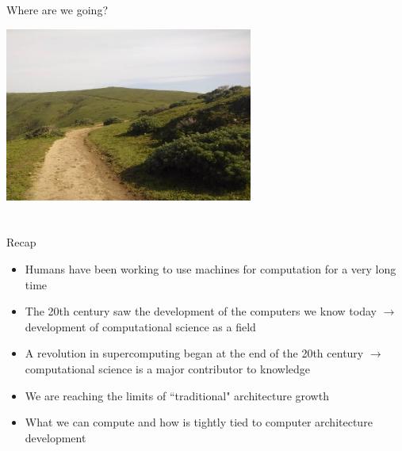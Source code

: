 \documentclass[xcolor=x11names,compress]{beamer}
\renewcommand{\(}{\begin{columns}}
\renewcommand{\)}{\end{columns}}
\newcommand{\<}[1]{\begin{column}{#1}}
\renewcommand{\>}{\end{column}}
\begin{document}
\begin{frame}{Where are we going?}
\begin{center}
\includegraphics[height=2.25in]{road}
\end{center}
\end{frame}

\section*{}
\begin{frame}{Recap}
\begin{itemize}
\item Humans have been working to use machines for computation for a very long time\vspace*{0.5 em}
\item The 20th century saw the development of the computers we know today $\rightarrow$ development of computational science as a field\vspace*{0.5 em}
\item A revolution in supercomputing began at the end of the 20th century $\rightarrow$ \alert{computational science is a major contributor to knowledge}\vspace*{0.5 em}
\item We are reaching the limits of ``traditional" architecture growth\vspace*{0.5 em}
\item What we can compute and how is tightly tied to computer architecture development
\end{itemize}
\end{frame}
\end{document}
